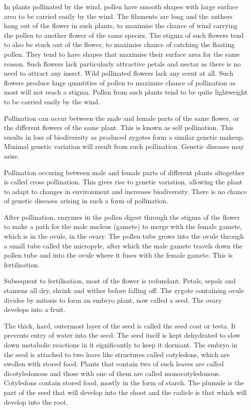 In plants pollinated by the wind, pollen have smooth shapes with large surface area to be carried
easily by the wind. The filaments are long and the anthers hang out of the flower in such plants,
to maximise the chance of wind carrying the pollen to another flower of the same species. The
stigma of such flowers tend to also be stuck out of the flower, to maximise chance of catching
the floating pollen. They tend to have shapes that maximise their surface area for the same reason.
Such flowers lack particularly attractive petals and nectar as there is no need to attract any
insect. Wild pollinated flowers lack any scent at all. Such flowers produce huge quantities of
pollen to maximise chance of pollination as most will not reach a stigma. Pollen from such plants
tend to be quite lightweight to be carried easily by the wind.

Pollination can occur between the male and female parts of the same flower, or the different
flowers of the same plant. This is known as self pollination. This results in loss of biodiversity
as produced zygotes form a similar genetic makeup. Minimal genetic variation will result from such
pollination. Genetic diseases may arise.

Pollination occuring between male and female parts of different plants altogether is called cross
pollination. This gives rise to genetic variation, allowing the plant to adapt to changes in
environment and increases biodiversity. There is no chance of genetic diseases arising in such a
form of pollination.

After pollination, enzymes in the pollen digest through the stigma of the flower to make a path
for the male nucleus (gamete) to merge with the female gamete, which is in the ovule, in the ovary.
The pollen tube grows into the ovule through a small tube called the micropyle, after which the
male gamete travels down the pollen tube and into the ovule where it fuses with the female gamete.
This is fertilisation.

Subsequent to fertilisation, most of the flower is redundant. Petals, sepals and stamens all dry,
shrink and wither before falling off. The zygote containing ovule divides by mitosis to form an
embryo plant, now called a seed. The ovary develops into a fruit. 

The thick, hard, outermost layer of the seed is called the seed coat or testa. It prevents entry of
water into the seed. The seed itself is kept dehydrated to slow down metabolic reactions in it
significantly to keep it dormant. The embryo in the seed is attached to two leave like structures
called cotyledons, which are swollen with stored food. Plants that contain two of such leaves are
called dicotyledonous and those with one of them are called monocotyledonous. Cotyledons contain
stored food, mostly in the form of starch. The plumule is the part of the seed that will develop
into the shoot and the radicle is that which will develop into the root.

